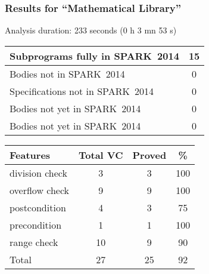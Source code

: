 \documentclass[10pt,a4paper,twocolumn]{article}
\newcommand{\newspark}{SPARK~2014\xspace}
\begin{document}
\subsubsection{Results for ``Mathematical Library''}

Analysis duration: 233 seconds (0 h 3 mn 53 s)

\vspace{5mm}

\begin{tabular}{|l|c|}
\hline
Subprograms fully in \newspark  & 15 \\
\hline
Bodies not in \newspark         & 0  \\
\hline
Specifications not in \newspark & 0  \\
\hline
Bodies not yet in \newspark     & 0  \\
\hline
Bodies not yet in \newspark     & 0  \\
\hline
\end{tabular}

\vspace{5mm}

\begin{tabular}{|l|c|c|c|}
\hline
Features       & Total VC & Proved & \%  \\ %
\hline
division check & 3        & 3      & 100 \\ %
\hline
overflow check & 9        & 9      & 100 \\ %
\hline
postcondition  & 4        & 3      & 75  \\ %
\hline
precondition   & 1        & 1      & 100 \\ %
\hline
range check    & 10       & 9      & 90  \\ %
\hline
Total          & 27       & 25     & 92  \\ %
\hline
\end{tabular}

\end{document}
